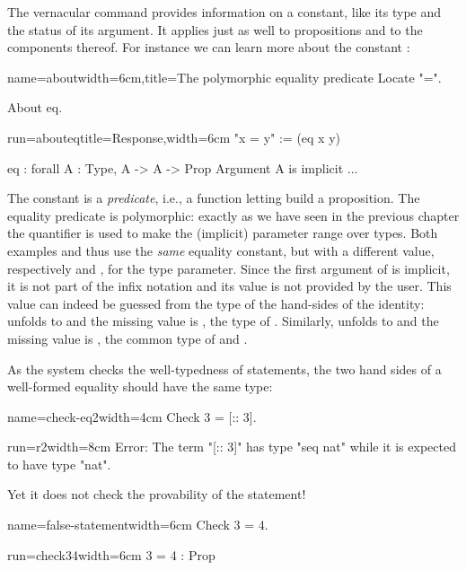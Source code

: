 The  vernacular
command provides information on a constant, like its
type and the status of its argument. It applies just as well to
propositions and to the components thereof. For instance we can learn more
about the constant :

\begin{coq}{name=about}{width=6cm,title=The polymorphic equality predicate}
Locate "=".

About eq.
$~$
\end{coq}
\begin{coqout}{run=abouteq}{title=Response,width=6cm}
"x = y" := (eq x y)

eq : forall A : Type, A -> A -> Prop
Argument A is implicit ...
\end{coqout}

The constant  is a \emph{predicate}, i.e., a function letting
build a proposition. The equality
predicate is polymorphic: exactly as we have seen in the previous
chapter the  quantifier is used to make the (implicit)
parameter  range over types. Both examples  and  thus use the \emph{same} equality constant, but with
a different value, respectively  and , for the type
parameter. Since the first argument of  is implicit, it is not
part of the infix notation and its value is not
provided by the user. This value can indeed be guessed from the type of the
hand-sides of the identity:  unfolds to  and
the missing value is , the type of . Similarly,
 unfolds to 
and the missing value is , the common type of  and
.

As the \Coq{} system checks the well-typedness of statements,
the two hand sides of a well-formed equality should have the same
type:

\begin{coq}{name=check-eq2}{width=4cm}
Check 3 = [:: 3].
$~$
\end{coq}
\begin{coqout}{run=r2}{width=8cm}
Error: The term "[:: 3]" has type "seq nat"
 while it is expected to have type "nat".
\end{coqout}
Yet it does not check the provability of the statement!

\begin{coq}{name=false-statement}{width=6cm}
Check 3 = 4.
\end{coq}
\begin{coqout}{run=check34}{width=6cm}
3 = 4 : Prop
\end{coqout}


